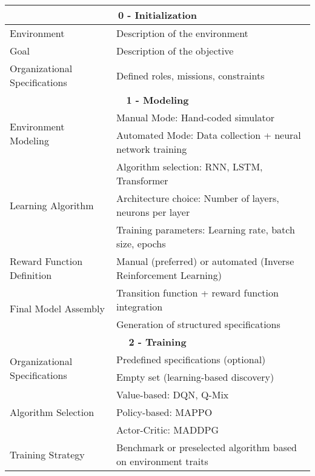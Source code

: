 \begin{table}[h!]
    \centering
    \renewcommand{\arraystretch}{1.3}
    \begin{tabular}{|l|p{10cm}|}
        \hline
        \multicolumn{2}{|c|}{\textbf{0 - Initialization}} \\ \hline
        Environment & Description of the environment \\ \hline
        Goal & Description of the objective \\ \hline
        Organizational Specifications & Defined roles, missions, constraints \\ \hline

        \multicolumn{2}{|c|}{\textbf{1 - Modeling}} \\ \hline
        \multirow{2}{*}{Environment Modeling} 
            & Manual Mode: Hand-coded simulator \\ 
            & Automated Mode: Data collection + neural network training \\ \hline
        \multirow{3}{*}{Learning Algorithm}  
            & Algorithm selection: RNN, LSTM, Transformer \\ 
            & Architecture choice: Number of layers, neurons per layer \\ 
            & Training parameters: Learning rate, batch size, epochs \\ \hline
        Reward Function Definition & Manual (preferred) or automated (Inverse Reinforcement Learning) \\ \hline
        \multirow{2}{*}{Final Model Assembly} 
            & Transition function + reward function integration \\ 
            & Generation of structured specifications \\ \hline

        \multicolumn{2}{|c|}{\textbf{2 - Training}} \\ \hline
        \multirow{2}{*}{Organizational Specifications} 
            & Predefined specifications (optional) \\ 
            & Empty set (learning-based discovery) \\ \hline
        \multirow{3}{*}{Algorithm Selection} 
            & Value-based: DQN, Q-Mix \\ 
            & Policy-based: MAPPO \\ 
            & Actor-Critic: MADDPG \\ \hline
        Training Strategy & Benchmark or preselected algorithm based on environment traits \\ \hline


\end{tabular}
\end{table}
